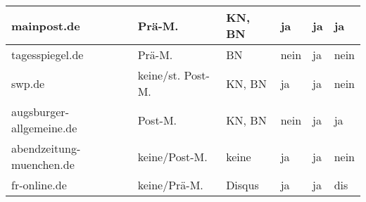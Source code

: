 \begin{table}
\begin{tabular}{p{28mm}*{5}{l}}
mainpost.de
& Prä-M.
& KN, BN
& ja
& ja
& ja
\\*\midrule

tagesspiegel.de
& Prä-M.
& BN
& nein
& ja
& nein
\\*\midrule

swp.de
& keine/st. Post-M.
& KN, BN
& ja
& ja
& nein
\\*\midrule

augsburger-allgemeine.de
& Post-M.
& KN, BN
& nein
& ja
& ja
\\*\midrule

abendzeitung-muenchen.de
& keine/Post-M.
& keine
& ja
& ja
& nein

\\*\midrule

fr-online.de
& keine/Prä-M.
& Disqus
& ja
& ja
& dis

\\*\bottomrule

  \end{tabular}
\end{table}

